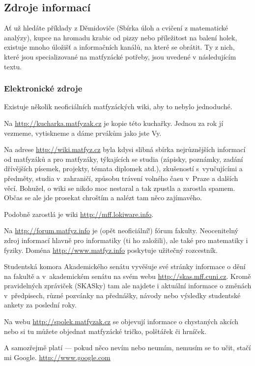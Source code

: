 \subsection{Zdroje informací}
Ať už hledáte příklady z Děmidoviče (Sbírka úloh a cvičení z matematické analýzy), kupce na hromadu krabic od pizzy nebo příležitost na balení holek, existuje mnoho úložišť a informačních kanálů, na které se obrátit. Ty z nich, které jsou specializované na matfyzácké potřeby, jsou uvedené v následujícím textu.

\subsubsection{Elektronické zdroje}
\medskip
{}
Existuje několik neoficiálních matfyzáckých wiki, aby to nebylo jednoduché.

Na \url{http://kucharka.matfyzak.cz} je kopie této kuchařky. Jednou za rok jí vezmeme, vytiskneme a dáme prvákům jako jste Vy.

Na adrese \url{http://wiki.matfyz.cz} byla kdysi slibná sbírka nejrůznějších informací od matfyzáků a pro matfyzáky, týkajících se studia (zápisky, poznámky, zadání dřívějších písemek, projekty, témata diplomek atd.), zkušeností s~vyučujícími a předměty, studia v~zahraničí, způsobu trávení volného času v~Praze a dalších věcí. Bohužel, o wiki se nikdo moc nestaral a tak zpustla a zarostla spamem. Občas se ale jde prosekat chroštím a nalézt tam něco zajímavého.

Podobně zarostlá je wiki \url{http://mff.lokiware.info}.

Na \url{http://forum.matfyz.info} je (opět neoficiální!) fórum fakulty. Neocenitelný zdroj informací hlavně pro informatiky (ti ho založili), ale také pro matematiky i fyziky. Doména \url{http://www.matfyz.info} poskytuje užitečný rozcestník.

Studentská komora Akademického senátu vyvěšuje své stránky informace o dění na fakultě a v~akademickém senátu na svém webu \url{http://skas.mff.cuni.cz}. Kromě pravidelných zpráviček (SKASky) tam ale najdete i aktuální informace o změnách v~předpisech, různé pozvánky na přednášky, návody nebo výsledky studentské ankety za poslední roky.

Na webu \url{http://spolek.matfyzak.cz} se objevují informace o chystaných
akcích nebo si tu můžete objednat matfyzácké tričko, polštářek či
hrníček.

A samozřejmě platí --- pokud něco nevím nebo neumím, nemusím se to učit, stačí mi Google. \url{http://www.google.com}

